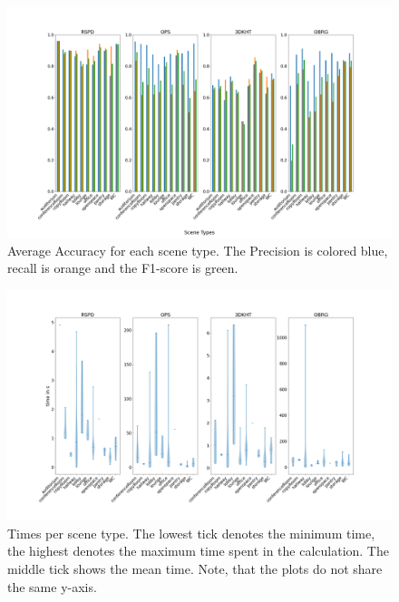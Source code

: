 \documentclass[main.tex]{subfiles}
\begin{document}
\begin{figure}[H]
    \centering
    \includegraphics[width=\textwidth]{images/accuracy_total.png}
    \caption[Accuracy Results 2D-3D-S]{Average Accuracy for each scene type. The Precision
        is colored blue, recall is orange and the F1-score is green.}
    \label{fig:stanfordaccuracy}
\end{figure}

\begin{figure}[H]
    \centering
    \includegraphics[width=15 cm]{images/times_violin.png}
    \caption[Time Results 2D-3D-S]{Times per scene type. The lowest tick denotes the minimum time, the highest
        denotes the maximum time spent in the calculation. The middle tick shows the mean time.
        Note, that the plots
        do not share the same y-axis.}
    \label{fig:violintime}
\end{figure}
\end{document}
